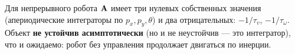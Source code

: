 \begin{notebox}
Для непрерывного робота $\mathbf{A}$ имеет три нулевых собственных значения
(апериодические интеграторы по $p_x, p_y, \theta$) и два отрицательных:
$-1/\tau_v$, $-1/\tau_\omega$. Объект \textbf{не устойчив асимптотически}
(но и не неустойчив --- это интегратор), что и ожидаемо: робот без
управления продолжает двигаться по инерции.
\end{notebox}
